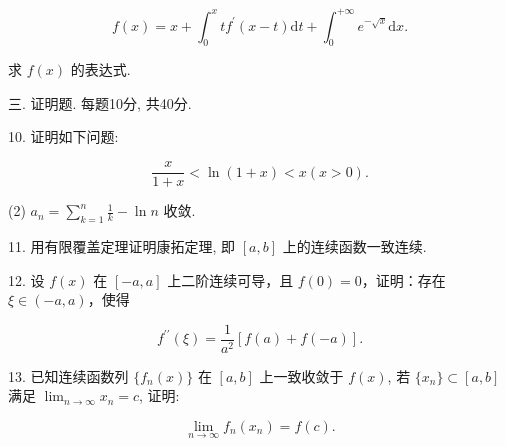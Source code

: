 \documentclass{examcollection}
\renewcommand{\displayformula}[1]{\[#1\]}
\begin{document}
{\begin{minipage}{\textwidth}
\displayformula{f (x) = x + \int_ {0} ^ {x} t f ^ {\prime} (x - t) \mathrm{d} t + \int_ {0} ^ {+ \infty} e ^ {- \sqrt {x}} \mathrm{d} x.}\par
求 $f(x)$ 的表达式.\par
三. 证明题. 每题10分, 共40分.\par
10. 证明如下问题:\par
\displayformula{\frac {x}{1 + x} <   \ln (1 + x) <   x (x > 0). \tag {1}}\par
(2) $a_{n} = \sum_{k=1}^{n} \frac{1}{k} - \ln n$ 收敛.\par
11. 用有限覆盖定理证明康拓定理, 即 $[a, b]$ 上的连续函数一致连续.\par
12. 设 $f(x)$ 在 $[-a, a]$ 上二阶连续可导，且 $f(0) = 0$，证明：存在 $\xi \in (-a, a)$，使得\par
\displayformula{f ^ {\prime \prime} (\xi) = \frac {1}{a ^ {2}} [ f (a) + f (- a) ].}\par
13. 已知连续函数列 $\{f_n(x)\}$ 在 $[a, b]$ 上一致收敛于 $f(x)$, 若 $\{x_n\} \subset [a, b]$ 满足 $\lim_{n \to \infty} x_n = c$, 证明:\par
\displayformula{\lim _ {n \rightarrow \infty} f _ {n} (x _ {n}) = f (c).}\par
\end{minipage}}
\ifdim\dimexpr\ht\proofbox+\dp\proofbox\relax>\textheight
\noindent\resizebox{!}{\textheight}{\usebox{\proofbox}}\else\noindent\usebox{\proofbox}\fi\clearpage
\end{document}
